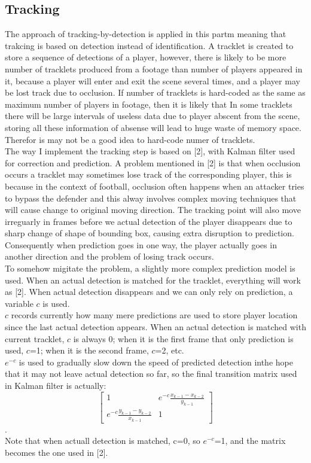 \documentclass{article}
\begin{document}
\subsection{Tracking}
The approach of tracking-by-detection is applied in this partm meaning that trakcing is based on detection instead of identification. A tracklet is created to store a sequence of detections of a player, however, there is likely to be more number of tracklets produced from a footage than number of players appeared in it, because a player will enter and exit the scene several times, and a player may be lost track due to occlusion. If number of tracklets is hard-coded as the same as maximum number of players in footage, then it is likely that In some tracklets there will be large intervals of useless data due to player abscent from the scene, storing all these information of absense will lead to huge waste of memory space. Therefor is may not be a good idea to hard-code numer of tracklets.\\
The way I implement the tracking step is based on [2], with Kalman filter used for correction and prediction.
A problem mentioned in [2] is that when occlusion occurs a tracklet may sometimes lose track of the corresponding player, this is because in the context of football, occlusion often happens when an attacker tries to bypass the defender and this alway involves complex moving techniques that will cause change to original moving direction. The tracking point will also move irreguarly in frames before we actual detection of the player disappears due to sharp change of shape of bounding box, causing extra disruption to prediction. Consequently when prediction goes in one way, the player actually goes in another direction and the problem of losing track occurs.\\
To somehow migitate the problem, a slightly more complex prediction model is used. When an actual detection is matched for the tracklet, everything will work as [2]. When actual detection disappears and we can only rely on prediction, a variable $c$ is used.\\
$c$ records currently how many mere predictions are used to store player location since the last actual detection appears. When an actual detection is matched with current tracklet, $c$ is always 0; when it is the first frame that only prediction is used, $c$=1; when it is the second frame, $c$=2, etc.\\
$e^{-c}$ is used to gradually slow down the speed of predicted detection inthe hope that it may not leave actual detection so far, so the final transition matrix used in Kalman filter is actually:\\
\[\begin{bmatrix}1 & e^{-c}\frac{x_{k-1}-x_{k-2}}{y_{k-1}} \\e^{-c}\frac{y_{k-1}-y_{k-2}}{x_{k-1}} & 1 \end{bmatrix}\].\\
Note that when actuall detection is matched, c=0, so $e^{-c}$=1, and the matrix becomes the one used in [2].\\
\end{document}
